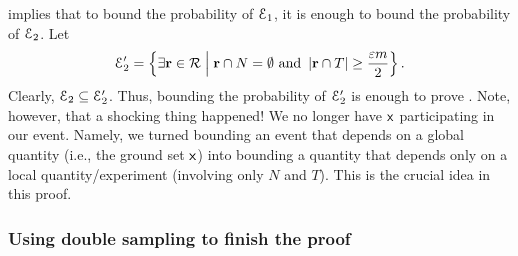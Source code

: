  implies that to bound the probability of $\EuScript{E}_1$,
it is enough to bound the probability of $\EuScript{E}_2$.  Let
\begin{equation*}
    \Event_2'%
    =%
    \Set{ \exists{\range \in \RangeSet} }{\bigl. \range \cap
       N
       = \emptyset \text{ and }\cardin{\range \cap T} \geq
       \frac{\eps m}{2} }.
\end{equation*}
Clearly, $\EuScript{E}_2 \subseteq \EuScript{E}_2'$. Thus, bounding the
probability of $\EuScript{E}_2'$ is enough to prove
. Note, however, that a shocking thing happened!
We no longer have $\mathsf{x}$ participating in our event. Namely, we
turned bounding an event that depends on a global quantity (i.e., the
ground set $\mathsf{x}$) into bounding a quantity that depends only
on a local quantity/experiment (involving only $N$ and $T$).  This is
the crucial idea in this proof.

\subsubsection{Using double sampling to finish the proof}



